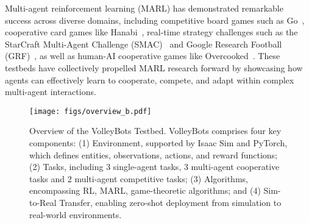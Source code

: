 

Multi-agent reinforcement learning (MARL) has demonstrated remarkable success across diverse domains, including competitive board games such as Go~\cite{silver2016mastering}, cooperative card games like Hanabi~\cite{bard2020hanabi}, real-time strategy challenges such as the StarCraft Multi-Agent Challenge (SMAC)~\cite{samvelyan2019starcraft,ellis2024smacv2} and Google Research Football (GRF)~\cite{kurach2020google}, as well as human-AI cooperative games like Overcooked~\cite{carroll2019utility}. These testbeds have collectively propelled MARL research forward by showcasing how agents can effectively learn to cooperate, compete, and adapt within complex multi-agent interactions.

\begin{figure*}[t]
    \centering
    \texttt{[image: figs/overview\_b.pdf]}
    \caption{Overview of the VolleyBots Testbed. VolleyBots comprises four key components: (1) Environment, supported by Isaac Sim and PyTorch, which defines entities, observations, actions, and reward functions; (2) Tasks, including 3 single-agent tasks, 3 multi-agent cooperative tasks and 2 multi-agent competitive tasks; (3) Algorithms, encompassing RL, MARL, game-theoretic algorithms; and (4) Sim-to-Real Transfer, enabling zero-shot deployment from simulation to real-world environments. }
    \label{fig:overview}
\end{figure*}

